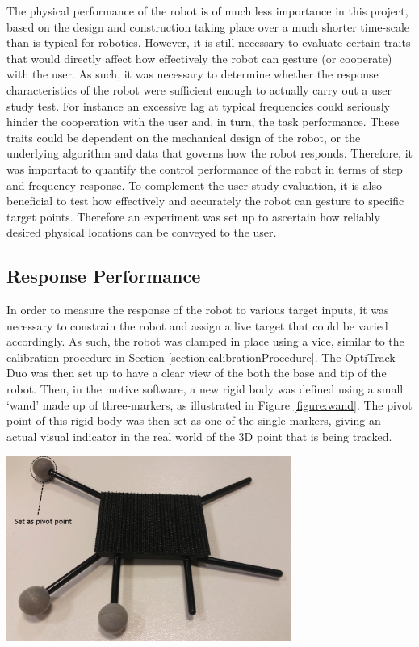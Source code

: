 \documentclass[11pt]{article}
\begin{document}
The physical performance of the robot is of much less importance in this project, based on the design and construction taking place over a much shorter time-scale than is typical for robotics. However, it is still necessary to evaluate certain traits that would directly affect how effectively the robot can gesture (or cooperate) with the user. As such, it was necessary to determine whether the response characteristics of the robot were sufficient enough to actually carry out a user study test. For instance an excessive lag at typical frequencies could seriously hinder the cooperation with the user and, in turn, the task performance. These traits could be dependent on the mechanical design of the robot, or the underlying algorithm and data that governs how the robot responds. Therefore, it was important to quantify the control performance of the robot in terms of step and frequency response. To complement the user study evaluation, it is also beneficial to test how effectively and accurately the robot can gesture to specific target points. Therefore an experiment was set up to ascertain how reliably desired physical locations can be conveyed to the user. 


\subsection{Response Performance}
In order to measure the response of the robot to various target inputs, it was necessary to constrain the robot and assign a live target that could be varied accordingly. As such, the robot was clamped in place using a vice, similar to the calibration procedure in Section \ref{section:calibrationProcedure}. The OptiTrack Duo was then set up to have a clear view of the both the base and tip of the robot. Then, in the motive software, a new rigid body was defined using a small `wand' made up of three-markers, as illustrated in Figure \ref{figure:wand}. The pivot point of this rigid body was then set as one of the single markers, giving an actual visual indicator in the real world of the 3D point that is being tracked.

\begin{center}
\includegraphics[width=0.7\textwidth]{images/wand.png}
\label{figure:wand}
\end{center}
\end{document}
